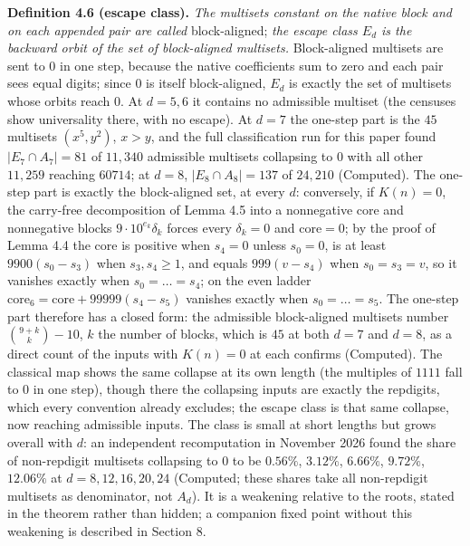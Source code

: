 \documentclass[11pt,letterpaper]{article}
\theoremstyle{paperstyle}
\theoremstyle{paperstyledef}
\theoremstyle{paperstylerem}
\begin{document}
\textbf{Definition 4.6 (escape class).} \emph{The multisets constant on the native block and on each appended pair are called} block-aligned; \emph{the escape class \(E_d\) is the backward orbit of the set of block-aligned multisets.} Block-aligned multisets are sent to \(0\) in one step, because the native coefficients sum to zero and each pair sees equal digits; since \(0\) is itself block-aligned, \(E_d\) is exactly the set of multisets whose orbits reach \(0\). At \(d = 5, 6\) it contains no admissible multiset (the censuses show universality there, with no escape). At \(d = 7\) the one-step part is the \(45\) multisets \((x^5, y^2)\), \(x > y\), and the full classification run for this paper found \(|E_7 \cap A_7| = 81\) of \(11{,}340\) admissible multisets collapsing to \(0\) with all other \(11{,}259\) reaching \(60714\); at \(d = 8\), \(|E_8 \cap A_8| = 137\) of \(24{,}210\) (Computed). The one-step part is exactly the block-aligned set, at every \(d\): conversely, if \(K(n) = 0\), the carry-free decomposition of Lemma 4.5 into a nonnegative core and nonnegative blocks \(9 \cdot 10^{e_k}\delta_k\) forces every \(\delta_k = 0\) and \(\mathrm{core} = 0\); by the proof of Lemma 4.4 the core is positive when \(s_4 = 0\) unless \(s_0 = 0\), is at least \(9900(s_0 - s_3)\) when \(s_3, s_4 \geq 1\), and equals \(999(v - s_4)\) when \(s_0 = s_3 = v\), so it vanishes exactly when \(s_0 = \dots = s_4\); on the even ladder \(\mathrm{core}_6 = \mathrm{core} + 99999(s_4 - s_5)\) vanishes exactly when \(s_0 = \dots = s_5\). The one-step part therefore has a closed form: the admissible block-aligned multisets number \(\binom{9+k}{k} - 10\), \(k\) the number of blocks, which is \(45\) at both \(d = 7\) and \(d = 8\), as a direct count of the inputs with \(K(n) = 0\) at each confirms (Computed). The classical map shows the same collapse at its own length (the multiples of \(1111\) fall to \(0\) in one step), though there the collapsing inputs are exactly the repdigits, which every convention already excludes; the escape class is that same collapse, now reaching admissible inputs. The class is small at short lengths but grows overall with \(d\): an independent recomputation in November 2026 found the share of non-repdigit multisets collapsing to \(0\) to be \(0.56\%\), \(3.12\%\), \(6.66\%\), \(9.72\%\), \(12.06\%\) at \(d = 8, 12, 16, 20, 24\) (Computed; these shares take all non-repdigit multisets as denominator, not \(A_d\)). It is a weakening relative to the roots, stated in the theorem rather than hidden; a companion fixed point without this weakening is described in Section 8.
\end{document}
